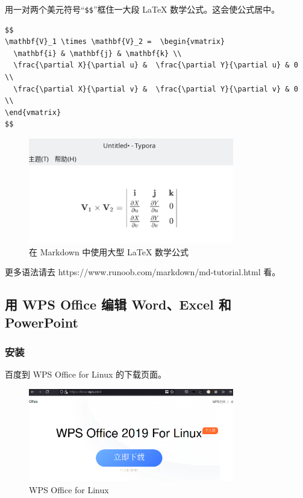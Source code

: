 \documentclass[UTF-8]{ctexart}
\begin{document}
				用一对两个美元符号“\texttt{\$\$}”框住一大段 LaTeX 数学公式。这会使公式居中。

				\begin{verbatim}
$$
\mathbf{V}_1 \times \mathbf{V}_2 =  \begin{vmatrix} 
  \mathbf{i} & \mathbf{j} & \mathbf{k} \\
  \frac{\partial X}{\partial u} &  \frac{\partial Y}{\partial u} & 0 \\
  \frac{\partial X}{\partial v} &  \frac{\partial Y}{\partial v} & 0 \\
\end{vmatrix}
$$
				\end{verbatim}
			
				\begin{figure}[H]
					\centering
					\includegraphics[width=0.8\textwidth]{fig/markdown_bigmath.png}
					\caption*{在 Markdown 中使用大型 LaTeX 数学公式}
				\end{figure}
			
				更多语法请去 https://www.runoob.com/markdown/md-tutorial.html 看。
				
		\newpage
		
		\subsection{用 WPS Office 编辑 Word、Excel 和 PowerPoint}
		
			\subsubsection{安装}
			
				百度到 WPS Office for Linux 的下载页面。
				
				\begin{figure}[H]
					\centering
					\includegraphics[width=0.8\textwidth]{fig/wps_office.png}
					\caption*{WPS Office for Linux}
				\end{figure}
			
\end{document}
